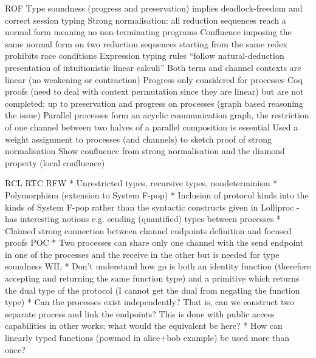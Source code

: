 \documentclass[11pt]{article}
\begin{document}
ROF
 Type soundness (progress and preservation) implies deadlock-freedom and
correct session typing
 Strong normalisation: all reduction sequences reach a normal form meaning
no non-terminating programs
 Confluence imposing the same normal form on two reduction sequences starting
from the same redex prohibits race conditions
 Expression typing rules ``follow natural-deduction presentation of
intuitionistic linear calculi''
 Both term and channel contexts are linear (no weakening or contraction)
 Progress only considered for processes
 Coq proofs (need to deal with context permutation since they are linear) but
are not completed; up to preservation and progress on processes (graph based
reasoning the issue)
 Parallel processes form an acyclic communication graph, the restriction of
one channel between two halves of a parallel composition is essential
 Used a weight assignment to processes (and channels) to sketch proof of
strong normalisation
 Show confluence from strong normalisation and the diamond property (local
confluence)


RCL
RTC
RFW
* Unrestricted types, recursive types, nondeterminism
* Polymorphism (extension to System F-pop)
* Inclusion of protocol kinds into the kinds of System F-pop rather than the
syntactic constructs given in Lolliproc
  - has interesting notions e.g. sending (quantified) types between processes
* Claimed strong connection between channel endpoints definition and focused
proofs
POC
* Two processes can share only one channel with the send endpoint in one of
the processes and the receive in the other but is needed for type soundness
WIL
* Don't understand how go is both an identity function (therefore accepting
and returning the same function type) and a primitive which returns the dual
type of the protocol (I cannot get the dual from negating the function type)
* Can the processes exist independently? That is, can we construct two
separate process and link the endpoints? This is done with public access
capabilities in other works; what would the equivalent be here?
* How can linearly typed functions (powmod in alice+bob example) be used more
than once?
\end{document}
